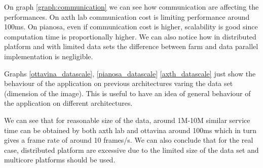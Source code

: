 On graph \ref{graph:communication} we can see how communication are affecting the performances.
On axth lab communication cost is limiting performance around 100ms.
On pianosa, even if communication cost is higher, scalability is good since computation time is proportionally higher.
We can also notice how in distributed platform and with limited data sets the difference between farm and data parallel implementation is negligible.

Graphs \ref{ottavina_datascale}, \ref{pianosa_datascale} \ref{axth_datascale} just show the behaviour of the application on previous architectures varing the data set (dimension of the image). 
This is useful to have an idea of general behaviour of the application on different architectures.

We can see that for reasonable size of the data, around 1M-10M similar service time can be obtained by both axth lab and ottavina around 100ms which in turn gives a frame rate of around 10 frames/s.
We can also conclude that for the real case, distributed platform are excessive due to the limited size of the data set and multicore platforms should be used.